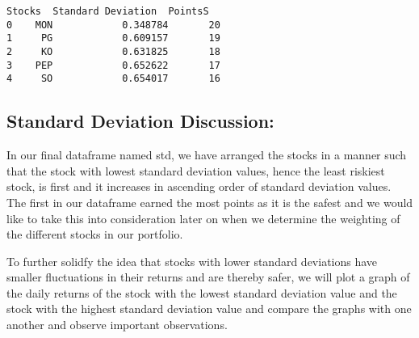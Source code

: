 \documentclass[11pt]{article}
\makeatletter
\newcommand{\boxspacing}{\kern\kvtcb@left@rule\kern\kvtcb@boxsep}
\newcommand{\prompt}[4]{
        {\ttfamily\llap{{\color{#2}[#3]:\hspace{3pt}#4}}\vspace{-\baselineskip}}
    }
\makeatother
\begin{document}
            \begin{tcolorbox}[breakable, size=fbox, boxrule=.5pt, pad at break*=1mm, opacityfill=0]
\prompt{Out}{outcolor}{8}{\boxspacing}
\begin{Verbatim}[commandchars=\\\{\}]
  Stocks  Standard Deviation  PointsS
0    MON            0.348784       20
1     PG            0.609157       19
2     KO            0.631825       18
3    PEP            0.652622       17
4     SO            0.654017       16
\end{Verbatim}
\end{tcolorbox}
        
    \hypertarget{standard-deviation-discussion}{%
\subsection{Standard Deviation
Discussion:}\label{standard-deviation-discussion}}

In our final dataframe named std, we have arranged the stocks in a
manner such that the stock with lowest standard deviation values, hence
the least riskiest stock, is first and it increases in ascending order
of standard deviation values. The first in our dataframe earned the most
points as it is the safest and we would like to take this into
consideration later on when we determine the weighting of the different
stocks in our portfolio.

To further solidfy the idea that stocks with lower standard deviations
have smaller fluctuations in their returns and are thereby safer, we
will plot a graph of the daily returns of the stock with the lowest
standard deviation value and the stock with the highest standard
deviation value and compare the graphs with one another and observe
important observations.
\end{document}
